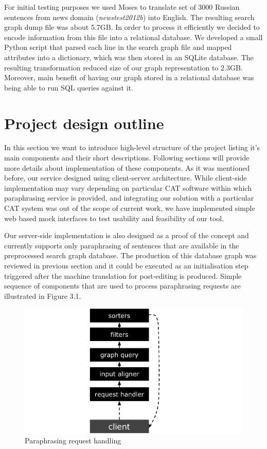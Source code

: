 For initial testing purposes we used Moses to translate set of 3000 Russian sentences from news domain (\textit{newstest2012b}) into English. The resulting search graph dump file was about 5.7GB. In order to process it efficiently we decided to encode information from this file into a relational database. We developed a small Python script that parsed each line in the search graph file and mapped attributes into a dictionary, which was then stored in an SQLite database. The resulting transformation reduced size of our graph representation to 2.3GB. Moreover, main benefit of having our graph stored in a relational database was being able to run SQL queries against it. 

\section{Project design outline}

In this section we want to introduce high-level structure of the project listing it's main components and their short descriptions. Following sections will provide more details about implementation of these components. As it was mentioned before, our service designed using client-server architecture. While client-side implementation may vary depending on particular CAT software within which paraphrasing service is provided, and integrating our solution with a particular CAT system was out of the scope of current work, we have implemented simple web based mock interfaces to test usability and feasibility of our tool. 

Our server-side implementation is also designed as a proof of the concept and currently supports only paraphrasing of sentences that are available in the preprocessed search graph database. The production of this database graph was reviewed in previous section and it could be executed as an initialisation step triggered after the machine translation for post-editing is produced. Simple sequence of components that are used to process paraphrasing requests are illustrated in Figure 3.1.

\begin{figure}
 \centering 
 \includegraphics{g/system-outline.pdf}
 \caption{Paraphrasing request handling}
\end{figure}

